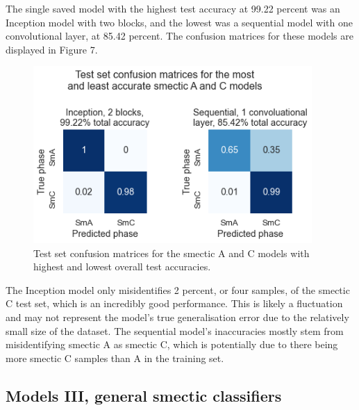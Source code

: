 \documentclass[12pt]{article}
\begin{document}
The single saved model with the highest test accuracy at 99.22 percent was an Inception model with two blocks, and the lowest was a sequential model with one convolutional layer, at 85.42 percent. The confusion matrices for these models are displayed in Figure 7.
\begin{figure}[!ht]
	\centering
    \includegraphics[width=4.174in]{images/confusion_matrix_2.png}
    \caption{Test set confusion matrices for the smectic A and C models with highest and lowest overall test accuracies.}
\end{figure} 
The Inception model only misidentifies 2 percent, or four samples, of the smectic C test set, which is an incredibly good performance. This is likely a fluctuation and may not represent the model's true generalisation error due to the relatively small size of the dataset. The sequential model's inaccuracies mostly stem from misidentifying smectic A as smectic C, which is potentially due to there being more smectic C samples than A in the training set. 
\subsection{Models III, general smectic classifiers}
\end{document}
